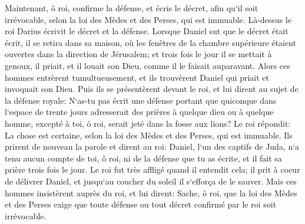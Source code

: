 \verse Maintenant, ô roi, confirme la défense, et écris le décret, afin qu`il soit irrévocable, selon la loi des Mèdes et des Perses, qui est immuable. 
\verse Là-dessus le roi Darius écrivit le décret et la défense. 
\verse Lorsque Daniel sut que le décret était écrit, il se retira dans sa maison, où les fenêtres de la chambre supérieure étaient ouvertes dans la direction de Jérusalem; et trois fois le jour il se mettait à genoux, il priait, et il louait son Dieu, comme il le faisait auparavant. 
\verse Alors ces hommes entrèrent tumultueusement, et ils trouvèrent Daniel qui priait et invoquait son Dieu. 
\verse Puis ils se présentèrent devant le roi, et lui dirent au sujet de la défense royale: N`as-tu pas écrit une défense portant que quiconque dans l`espace de trente jours adresserait des prières à quelque dieu ou à quelque homme, excepté à toi, ô roi, serait jeté dans la fosse aux lions? Le roi répondit: La chose est certaine, selon la loi des Mèdes et des Perses, qui est immuable. 
\verse Ils prirent de nouveau la parole et dirent au roi: Daniel, l`un des captifs de Juda, n`a tenu aucun compte de toi, ô roi, ni de la défense que tu as écrite, et il fait sa prière trois fois le jour. 
\verse Le roi fut très affligé quand il entendit cela; il prit à coeur de délivrer Daniel, et jusqu`au coucher du soleil il s`efforça de le sauver. 
\verse Mais ces hommes insistèrent auprès du roi, et lui dirent: Sache, ô roi, que la loi des Mèdes et des Perses exige que toute défense ou tout décret confirmé par le roi soit irrévocable. 
